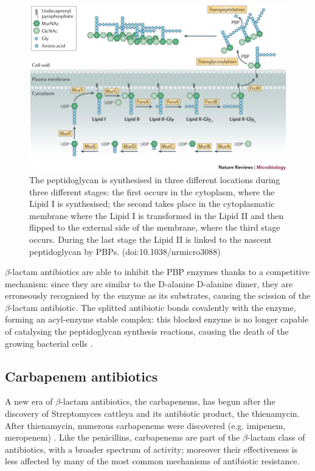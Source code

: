 \documentclass[11pt]{report}
\begin{document}
\clearpage
\begin{figure}[htp]
\centering
\includegraphics[scale=0.50]{immagini gamalero/Peptidoglycan.jpg}
\caption{The peptidoglycan is synthesised in three different locations during three different stages: the first occurs in the cytoplasm, where the Lipid I is synthesised; the second takes place in the cytoplasmatic membrane where the Lipid I is transformed in the Lipid II and then flipped to the external side of the membrane, where the third stage occurs. During the last stage the Lipid II is linked to the nascent peptidoglycan by PBPs. (doi:10.1038/nrmicro3088)}
\label{}
\end{figure}


$\beta$-lactam antibiotics are able to inhibit the PBP enzymes thanks to a competitive mechanism: since they are similar to the D-alanine D-alanine dimer, they are erroneously recognised by the enzyme as its substrates, causing the scission of the $\beta$-lactam antibiotic.
The splitted antibiotic bonds covalently with the enzyme, forming an acyl-enzyme stable complex: this blocked enzyme is no longer capable of catalysing the peptidoglycan synthesis reactions, causing the death of the growing bacterial cells \cite{kong2010beta}.

\subsection{Carbapenem antibiotics}
A new era of $\beta$-lactam antibiotics, the carbapenems, has begun after the discovery of Streptomyces cattleya and its antibiotic product, the thienamycin.
After thienamycin, numerous carbapenems were discovered (e.g. imipenem, meropenem) \cite{Birnbaum1985}.
Like the penicillins, carbapenems are part of the $\beta$-lactam class of antibiotics, with a broader spectrum of activity; moreover their effectiveness is less affected by many of the most common mechanisms of antibiotic resistance.
\end{document}
